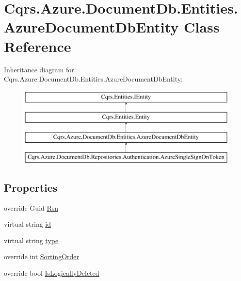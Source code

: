 \hypertarget{classCqrs_1_1Azure_1_1DocumentDb_1_1Entities_1_1AzureDocumentDbEntity}{}\section{Cqrs.\+Azure.\+Document\+Db.\+Entities.\+Azure\+Document\+Db\+Entity Class Reference}
\label{classCqrs_1_1Azure_1_1DocumentDb_1_1Entities_1_1AzureDocumentDbEntity}
Inheritance diagram for Cqrs.\+Azure.\+Document\+Db.\+Entities.\+Azure\+Document\+Db\+Entity\+:\begin{figure}[H]
\begin{center}
\leavevmode
\includegraphics[height=4.000000cm]{classCqrs_1_1Azure_1_1DocumentDb_1_1Entities_1_1AzureDocumentDbEntity}
\end{center}
\end{figure}
\subsection*{Properties}
\begin{DoxyCompactItemize}
\item 
override Guid \hyperlink{classCqrs_1_1Azure_1_1DocumentDb_1_1Entities_1_1AzureDocumentDbEntity_a9f8073973963c42fc44bb5fba84cf70a_a9f8073973963c42fc44bb5fba84cf70a}{Rsn}
\item 
virtual string \hyperlink{classCqrs_1_1Azure_1_1DocumentDb_1_1Entities_1_1AzureDocumentDbEntity_a70118763769fc358c7206ef04f12ff6f_a70118763769fc358c7206ef04f12ff6f}{id}
\item 
virtual string \hyperlink{classCqrs_1_1Azure_1_1DocumentDb_1_1Entities_1_1AzureDocumentDbEntity_a4696c1d70da779b260ba76588aff80a7_a4696c1d70da779b260ba76588aff80a7}{type}
\item 
override int \hyperlink{classCqrs_1_1Azure_1_1DocumentDb_1_1Entities_1_1AzureDocumentDbEntity_a65addaa44fbb57497e730f4f806bc820_a65addaa44fbb57497e730f4f806bc820}{Sorting\+Order}
\item 
override bool \hyperlink{classCqrs_1_1Azure_1_1DocumentDb_1_1Entities_1_1AzureDocumentDbEntity_ad3a216109e53eaa53aa1aa18eaea1f3a_ad3a216109e53eaa53aa1aa18eaea1f3a}{Is\+Logically\+Deleted}
\end{DoxyCompactItemize}


